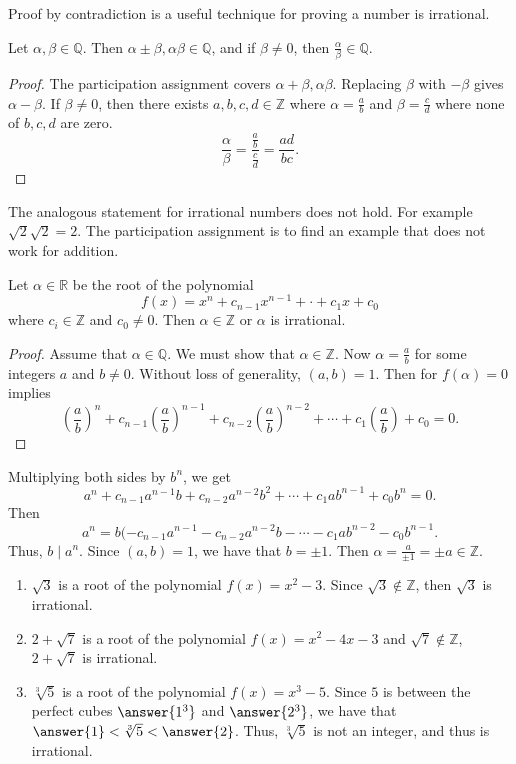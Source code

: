 \documentclass{ximera}
\begin{document}
Proof by contradiction is a useful technique for proving a number is irrational. 

\begin{theorem}
 Let $\alpha,\beta\in\mathbb{Q}$. Then $\alpha\pm\beta, \alpha\beta\in\mathbb{Q}$, and if $\beta\neq0$, then $\frac{\alpha}{\beta}\in\mathbb{Q}$. 
\end{theorem}
\begin{proof} The participation assignment covers $\alpha+\beta, \alpha\beta$. Replacing $\beta$ with $-\beta$ gives $\alpha-\beta$. If $\beta\neq0$, then there exists $a,b,c,d\in\mathbb{Z}$ where $\alpha=\frac{a}{b}$ and $\beta=\frac{c}{d}$ where none of $b,c,d$ are zero.
\[\frac{\alpha}{\beta}=\frac{\frac{a}{b}}{\frac{c}{d}}=\frac{ad}{bc}.\]
\end{proof}

The analogous statement for irrational numbers does not hold. For example $\sqrt{2}\sqrt{2}=2$. The participation assignment is to find an example that does not work for addition.

\begin{theorem}
 Let $\alpha\in\mathbb{R}$ be the root of the polynomial \[f(x)=x^n+c_{n-1}x^{n-1}+\cdot+c_1x+c_0\] where $c_i\in\mathbb{Z}$ and $c_0\neq 0$. Then $\alpha\in\mathbb{Z}$ or $\alpha$ is irrational.
\end{theorem}
\begin{proof}
 Assume that $\alpha\in\mathbb{Q}$. We must show that $\alpha\in\mathbb{Z}$. Now $\alpha=\frac{a}{b}$ for some integers $a$ and $b\neq 0$. Without loss of generality, $(a,b)=1$. Then for $f(\alpha)=0$ implies 
 \[\left(\frac{a}{b}\right)^n+c_{n-1}\left(\frac{a}{b}\right)^{n-1}+c_{n-2}\left(\frac{a}{b}\right)^{n-2}+\cdots+c_1\left(\frac{a}{b}\right) +c_0=0.\]
\end{proof}
Multiplying both sides by $b^n$, we get 
\[a^n+c_{n-1}a^{n-1}b+c_{n-2}a^{n-2}b^2+\cdots+c_1ab^{n-1}+c_0b^n=0.\]
Then \[a^n=b(-c_{n-1}a^{n-1}-c_{n-2}a^{n-2}b-\cdots-c_1ab^{n-2}-c_0b^{n-1}.\]
Thus, $b\mid a^n$. Since $(a,b)=1$, we have that $b=\pm 1$. Then $\alpha=\frac{a}{\pm1}=\pm a\in\mathbb{Z}$.

\begin{example}
\begin{enumerate}
 \item $\sqrt{3}$ is a root of the polynomial $f(x)=x^2-3$. Since $\sqrt{3}\not\in\mathbb{Z}$, then $\sqrt{3}$ is irrational.
 \item $2+\sqrt{7}$ is a root of the polynomial $f(x)=x^2-4x-3$ and $\sqrt{7}\not\in\mathbb{Z}$, $2+\sqrt{7}$ is irrational.
 \item $\sqrt[3]{5}$ is a root of the polynomial $f(x)=x^3-5$. Since $5$ is between the perfect cubes $\answer{1^3}$ and $\answer{2^3}$, we have that $\answer{1}<\sqrt[3]{5}<\answer{2}$. Thus, $\sqrt[3]{5}$ is not an integer, and thus is irrational.
\end{enumerate}
\end{example}
\end{document}
